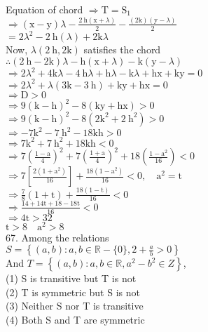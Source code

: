 \documentclass[10pt]{article}
\begin{document}
Equation of chord \(\Rightarrow \mathrm{T}=\mathrm{S}_{1}\)\\
\(\Rightarrow(\mathrm{x}-\mathrm{y}) \lambda-\frac{2 \mathrm{~h}(\mathrm{x}+\lambda)}{2}-\frac{(2 \mathrm{k})(\mathrm{y}-\lambda)}{2}\)\\
\(=2 \lambda^{2}-2 \mathrm{~h}(\lambda)+2 \mathrm{k} \lambda\)\\
Now, \(\lambda(2 \mathrm{~h}, 2 \mathrm{k})\) satisfies the chord\\
\(\therefore(2 \mathrm{~h}-2 \mathrm{k}) \lambda-\mathrm{h}(\mathrm{x}+\lambda)-\mathrm{k}(\mathrm{y}-\lambda)\)\\
\(\Rightarrow 2 \lambda^{2}+4 \mathrm{k} \lambda-4 \mathrm{~h} \lambda+\mathrm{h} \lambda-\mathrm{k} \lambda+\mathrm{hx}+\mathrm{ky}=0\)\\
\(\Rightarrow 2 \lambda^{2}+\lambda(3 \mathrm{k}-3 \mathrm{~h})+\mathrm{ky}+\mathrm{hx}=0\)\\
\(\Rightarrow \mathrm{D}>0\)\\
\(\Rightarrow 9(\mathrm{k}-\mathrm{h})^{2}-8(\mathrm{ky}+\mathrm{hx})>0\)\\
\(\Rightarrow 9(\mathrm{k}-\mathrm{h})^{2}-8\left(2 \mathrm{k}^{2}+2 \mathrm{~h}^{2}\right)>0\)\\
\(\Rightarrow-7 \mathrm{k}^{2}-7 \mathrm{~h}^{2}-18 \mathrm{kh}>0\)\\
\(\Rightarrow 7 \mathrm{k}^{2}+7 \mathrm{~h}^{2}+18 \mathrm{kh}<0\)\\
\(\Rightarrow 7\left(\frac{1-\mathrm{a}}{4}\right)^{2}+7\left(\frac{1+\mathrm{a}}{4}\right)^{2}+18\left(\frac{1-\mathrm{a}^{2}}{16}\right)<0\)\\
\(\Rightarrow 7\left[\frac{2\left(1+\mathrm{a}^{2}\right)}{16}\right]+\frac{18\left(1-\mathrm{a}^{2}\right)}{16}<0, \quad \mathrm{a}^{2}=\mathrm{t}\)\\
\(\Rightarrow \frac{7}{8}(1+\mathrm{t})+\frac{18(1-\mathrm{t})}{16}<0\)\\
\(\Rightarrow \frac{14+14 \mathrm{t}+18-18 \mathrm{t}}{16}<0\)\\
\(\Rightarrow 4 \mathrm{t}>32\)\\
\(\mathrm{t}>8 \quad \mathrm{a}^{2}>8\)\\
67. Among the relations\\
\(S=\left\{(a, b): a, b \in \mathbb{R}-\{0\}, 2+\frac{a}{b}>0\right\}\)\\
And \(T=\left\{(a, b): a, b \in \mathbb{R}, a^{2}-b^{2} \in Z\right\}\),\\
(1) S is transitive but T is not\\
(2) T is symmetric but S is not\\
(3) Neither S nor T is transitive\\
(4) Both S and T are symmetric
\end{document}
